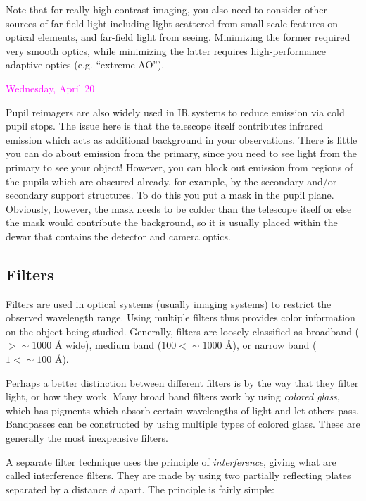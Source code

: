 \documentclass[12pt]{article}
\begin{document}
Note that for really high contrast imaging, you also need to consider
other sources of far-field light including light scattered from
small-scale features on optical elements, and far-field light from
seeing. Minimizing the former required very smooth optics, while
minimizing the latter requires high-performance adaptive optics (e.g.
``extreme-AO'').

\textcolor{magenta}{Wednesday, April 20}

Pupil reimagers are also widely used in IR systems to reduce emission
via cold pupil stops. The issue here is that the telescope itself
contributes infrared emission which acts as additional background in
your observations. There is little you can do about emission from the
primary, since you need to see light from the primary to see your
object! However, you can block out emission from regions of the pupils
which are obscured already, for example, by the secondary and/or
secondary support structures. To do this you put a mask in the pupil
plane. Obviously, however, the mask needs to be colder than the
telescope itself or else the mask would contribute the background, so
it is usually placed within the dewar that contains the detector and
camera optics.

\subsection*{Filters}
Filters are used in optical systems (usually imaging systems) to
restrict the observed wavelength range. Using multiple filters thus
provides color information on the object being studied. Generally,
filters are loosely classified as
broadband ($ > \sim 1000$ \AA{} wide),
medium band ($100 < \sim 1000$ \AA{}), or
narrow band ($1 < \sim 100$ \AA{}).


Perhaps a better distinction between different filters is by the way
that they filter light, or how they work.
Many broad band filters work by using \emph{colored
glass}, which has pigments which absorb certain wavelengths of light
and let others pass. Bandpasses can be constructed by using multiple
types of colored glass. These are generally the most inexpensive
filters.

A separate filter technique uses the principle of \emph{interference},
giving what are called interference filters. They are made by using two
partially reflecting plates separated by a distance $d$ apart. The
principle is fairly simple:
\end{document}
